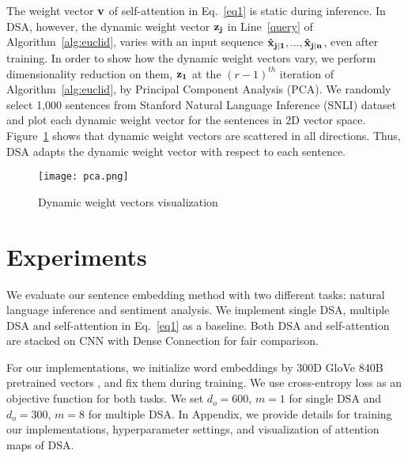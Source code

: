 \documentclass[11pt,a4paper]{article}
\begin{document}
The weight vector ${\bf v}$ of self-attention in Eq.~\ref{eq1} is static during inference. In DSA, however, the dynamic weight vector $\bf{z_j}$ in Line~\ref{query} of Algorithm~\ref{alg:euclid}, varies with an input sequence $\bf {\hat x}_{j|1}, ..., {\hat x}_{j|n}$, even after training. In order to show how the dynamic weight vectors vary, we perform dimensionality reduction on them, $\bf z_{1}$ at the $(r-1)^{th}$ iteration of Algorithm~\ref{alg:euclid}, by Principal Component Analysis (PCA). We randomly select 1,000 sentences from Stanford Natural Language Inference (SNLI) dataset and plot each dynamic weight vector for the sentences in 2D vector space. Figure~\ref{fig:pca} shows that dynamic weight vectors are scattered in all directions. Thus, DSA adapts the dynamic weight vector with respect to each sentence. \begin{figure}
        \centering    
        \texttt{[image: pca.png]}
        \caption{Dynamic weight vectors visualization}\label{fig:pca}
\end{figure}









\section {Experiments}\label{experiments}

We evaluate our sentence embedding method with two different tasks: natural language inference and sentiment analysis. We implement single DSA, multiple DSA and self-attention in Eq.~\ref{eq1} as a baseline. Both DSA and self-attention are stacked on CNN with Dense Connection for fair comparison.

For our implementations, we initialize word embeddings by 300D GloVe 840B pretrained vectors \cite{glove}, and fix them during training. We use cross-entropy loss as an objective function for both tasks. We set $d_o=600$, $m=1$ for single DSA and $d_o=300$, $m=8$ for multiple DSA. In Appendix, we provide details for training our implementations, hyperparameter settings, and visualization of attention maps of DSA.
\end{document}
